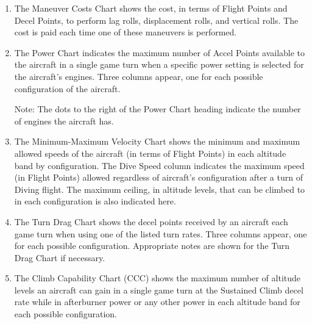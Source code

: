 \begin{enumerate}
    \item {}
        The Maneuver Costs Chart shows the cost, in terms of Flight Points and Decel Points, to perform lag rolls, displacement rolls, and vertical rolls. The cost is paid each time one of these maneuvers is performed.

    \item {}
        The Power Chart indicates the maximum number of Accel Points available to the aircraft in a single game turn when a specific power setting is selected for the aircraft's engines. Three columns appear, one for each possible configuration of the aircraft. 

        Note: The dots to the right of the Power Chart heading indicate the number of engines the aircraft has.

    \item {}
        The Minimum-Maximum Velocity Chart shows the minimum and maximum allowed speeds of the aircraft (in terms of Flight Points) in each altitude band by configuration. The Dive Speed column indicates the maximum speed (in Flight Points) allowed regardless of aircraft's configuration after a turn of Diving flight. The maximum ceiling, in altitude levels, that can be climbed to in each configuration is also indicated here.

    \item {}
        The Turn Drag Chart shows the decel points received by an aircraft each game turn when using one of the listed turn rates. Three columns appear, one for each possible configuration. Appropriate notes are shown for the Turn Drag Chart if necessary.

    \item {}
        The Climb Capability Chart (CCC) shows the maximum number of altitude levels an aircraft can gain in a single game turn at the Sustained Climb decel rate while in afterburner power or any other power in each altitude band for each possible configuration.

\end{enumerate}

